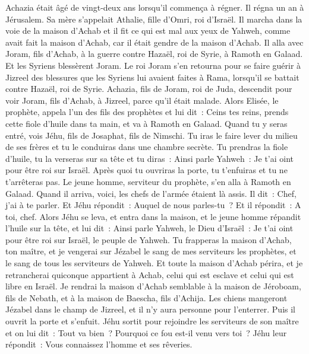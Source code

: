\begin{multicols}{2}
Achazia était âgé de vingt-deux ans lorsqu'il commença à régner. Il régna un an à Jérusalem. Sa mère s'appelait Athalie, fille d'Omri, roi d'Israël.
Il marcha dans la voie de la maison d'Achab et il fit ce qui est mal aux yeux de Yahweh, comme avait fait la maison d'Achab, car il était gendre de la maison d'Achab.
Il alla avec Joram, fils d'Achab, à la guerre contre Hazaël, roi de Syrie, à Ramoth en Galaad. Et les Syriens blessèrent Joram.
Le roi Joram s'en retourna pour se faire guérir à Jizreel des blessures que les Syriens lui avaient faites à Rama, lorsqu'il se battait contre Hazaël, roi de Syrie. Achazia, fils de Joram, roi de Juda, descendit pour voir Joram, fils d'Achab, à Jizreel, parce qu'il était malade.
\VerseOne{}Alors Elisée, le prophète, appela l'un des fils des prophètes et lui dit~: Ceins tes reins, prends cette fiole d'huile dans ta main, et va à Ramoth en Galaad.
Quand tu y seras entré, vois Jéhu, fils de Josaphat, fils de Nimschi. Tu iras le faire lever du milieu de ses frères et tu le conduiras dans une chambre secrète.
Tu prendras la fiole d'huile, tu la verseras sur sa tête et tu diras~: Ainsi parle Yahweh~: Je t'ai oint pour être roi sur Israël. Après quoi tu ouvriras la porte, tu t'enfuiras et tu ne t'arrêteras pas.
Le jeune homme, serviteur du prophète, s'en alla à Ramoth en Galaad.
Quand il arriva, voici, les chefs de l'armée étaient là assis. Il dit~: Chef, j'ai à te parler. Et Jéhu répondit~: Auquel de nous parles-tu~? Et il répondit~: A toi, chef.
Alors Jéhu se leva, et entra dans la maison, et le jeune homme répandit l'huile sur la tête, et lui dit~: Ainsi parle Yahweh, le Dieu d'Israël~: Je t'ai oint pour être roi sur Israël, le peuple de Yahweh.
Tu frapperas la maison d'Achab, ton maître, et je vengerai sur Jézabel le sang de mes serviteurs les prophètes, et le sang de tous les serviteurs de Yahweh.
Et toute la maison d'Achab périra, et je retrancherai quiconque appartient à Achab, celui qui est esclave et celui qui est libre en Israël.
Je rendrai la maison d'Achab semblable à la maison de Jéroboam, fils de Nebath, et à la maison de Baescha, fils d'Achija.
Les chiens mangeront Jézabel dans le champ de Jizreel, et il n'y aura personne pour l'enterrer. Puis il ouvrit la porte et s'enfuit.
Jéhu sortit pour rejoindre les serviteurs de son maître et on lui dit~: Tout va bien~? Pourquoi ce fou est-il venu vers toi~? Jéhu leur répondit~: Vous connaissez l'homme et ses rêveries.

\end{multicols}
